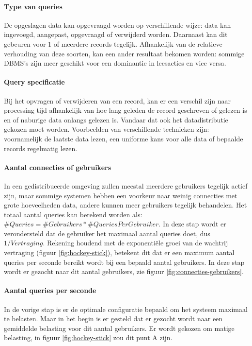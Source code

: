 \paragraph{Type van queries} De opgeslagen data kan opgevraagd worden op verschillende wijze: data kan ingevoegd, aangepast, opgevraagd of verwijderd worden. Daarnaast kan dit gebeuren voor 1 of meerdere records tegelijk. Afhankelijk van de relatieve verhouding van deze soorten, kan een ander resultaat bekomen worden: sommige DBMS's zijn meer geschikt voor een dominantie in leesacties en vice versa. 

\paragraph{Query specificatie} Bij het opvragen of verwijderen van een record, kan er een verschil zijn naar processing tijd afhankelijk van hoe lang geleden de record geschreven of gelezen is en of naburige data onlangs gelezen is. Vandaar dat ook het datadistributie gekozen moet worden. Voorbeelden van verschillende technieken zijn: voornamelijk de laatste data lezen, een uniforme kans voor alle data of bepaalde records regelmatig lezen.

\paragraph{Aantal connecties of gebruikers} In een gedistribueerde omgeving zullen meestal meerdere gebruikers tegelijk actief zijn, maar sommige systemen hebben een voorkeur naar weinig connecties met grote hoeveelheden data, andere kunnen meer gebruikers tegelijk behandelen. Het totaal aantal queries kan berekend worden als: $\#Queries = \#Gebruikers * \#QueriesPerGebruiker$. In deze stap wordt er verondersteld dat de gebruiker het maximaal aantal queries doet, dus $1/Vertraging$. Rekening houdend met de exponentiële groei van de wachtrij vertraging (figuur \ref{fig:hockey-stick}), betekent dit dat er een maximum aantal queries per seconde bereikt wordt bij een bepaald aantal gebruikers. In deze stap wordt er gezocht naar dit aantal gebruikers, zie figuur \ref{fig:connecties-gebruikers}. 

\paragraph{Aantal queries per seconde} In de vorige stap is er de optimale configuratie bepaald om het systeem maximaal te belasten. Maar in het begin is er gesteld dat er gezocht wordt naar een gemiddelde belasting voor dit aantal gebruikers. Er wordt gekozen om matige belasting, in figuur \ref{fig:hockey-stick} zou dit punt A zijn. 

